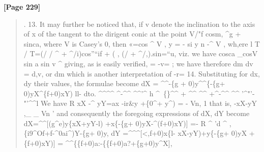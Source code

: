 \documentclass[11pt,a4paper]{book}
\begin{document}
\textbf{[Page 229]}\\[0.2cm]
\begin{quote}
.
13. It may further be noticed that, if v denote the inclination to the axis of x
of the tangent to the dirigent conic at the point V/"f cosm, \textasciicircum{}g + sinca, where
V is Casey's 0, then
«=cos \textasciicircum{} V , y = - si y n -\textasciicircum{} V , wh,ere l T / T=(/ / \textasciicircum{} + \textasciicircum{}/i)cos''``if + ( , (/ + \textasciicircum{}/,).sin=``u,
viz. we have
cosca \_cosV sin a sin v
\textasciicircum{}
giving, as is easily verified, = -v= ; we have therefore
dm dv
= d,v,
or
dm
which is another interpretation of -r=
14. Substituting for dx, dy their values, the formulae become
dX = \textasciicircum{}\textasciicircum{}-\{g + 0)y\textasciicircum{}\textasciicircum{}\{-\{g+ 0)yX\textasciicircum{}\{f+0)xY) ll- dto.
\textasciicircum{}\textasciicircum{}\textasciicircum{}\textasciicircum{} \textasciicircum{}-\textasciicircum{}\textasciicircum{} \textasciicircum{}\textasciicircum{}'\textasciicircum{} h \textasciicircum{}~\{\}\textasciicircum{}\textasciicircum{} + \textasciicircum{}\textasciicircum{} \textasciicircum{}\textasciicircum{} +\textasciicircum{}-\textasciicircum{}\textasciicircum{} \textasciicircum{}\textasciicircum{} '\textasciicircum{}"'-
"'\textasciicircum{}\textasciicircum{}l
We have
R
xX -\textasciicircum{} yY=ax -ir\&y +\{0\textasciicircum{}+ y\textasciicircum{})
= - Vn,
1
that is,
-xX-yY
,\_
\_
Vn
'
and consequently the foregoing expressions of dX, dY become
dX=\textasciicircum{}\textasciicircum{}[(g\textasciicircum{}e)y\{xX+yY-l) +x\{-\{g+ 0)yX-\textasciicircum{}(f+0)xY)]
=- R \textasciicircum{} 'd \textasciicircum{} , \{i9\textasciicircum{}Of+f-\textasciicircum{}0ai\textasciicircum{})Y-\{g+
0)y,
dY =\textasciicircum{}\textasciicircum{}\textasciicircum{}[<,f+0)x\{l- xX-yY)+y\{-\{g+ 0)yX + \{f+0)xY)]
= \textasciicircum{}\textasciicircum{}\{\{f+0)a:-\{\{f+0)a?+\{g+0)y\textasciicircum{}X],
\end{quote}
\end{document}
